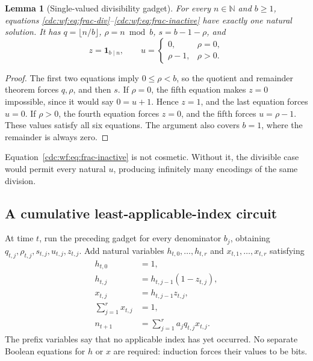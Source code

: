 \documentclass[11pt,a4paper]{article}
\newtheorem{lemma}[lemma]{Lemma}
\theoremstyle{definition}
\theoremstyle{remark}
\newcommand{\N}{\mathbb N}
\begin{document}
\begin{lemma}[Single-valued divisibility gadget]\label{cdc:wf:lem:division}
For every $n\in\N$ and $b\geq1$, equations \eqref{cdc:wf:eq:frac-div}--\eqref{cdc:wf:eq:frac-inactive} have exactly one natural solution. It has $q=\lfloor n/b\rfloor$, $\rho=n\bmod b$, $s=b-1-\rho$, and
\[
 z=\mathbf 1_{b\mid n},\qquad
 u=\begin{cases}0,&\rho=0,\\\rho-1,&\rho>0.\end{cases}
\]
\end{lemma}
\begin{proof}
The first two equations imply $0\leq\rho<b$, so the quotient and remainder theorem forces $q,\rho$, and then $s$. If $\rho=0$, the fifth equation makes $z=0$ impossible, since it would say $0=u+1$. Hence $z=1$, and the last equation forces $u=0$. If $\rho>0$, the fourth equation forces $z=0$, and the fifth forces $u=\rho-1$. These values satisfy all six equations. The argument also covers $b=1$, where the remainder is always zero.
\end{proof}

Equation~\eqref{cdc:wf:eq:frac-inactive} is not cosmetic. Without it, the divisible case would permit every natural $u$, producing infinitely many encodings of the same division.

\subsection{A cumulative least-applicable-index circuit}
At time $t$, run the preceding gadget for every denominator $b_j$, obtaining $q_{t,j},\rho_{t,j},s_{t,j},u_{t,j},z_{t,j}$. Add natural variables $h_{t,0},\ldots,h_{t,r}$ and $x_{t,1},\ldots,x_{t,r}$ satisfying
\begin{align}
 h_{t,0}&=1,\label{cdc:wf:eq:frac-h0}\\
 h_{t,j}&=h_{t,j-1}(1-z_{t,j}),\label{cdc:wf:eq:frac-prefix}\\
 x_{t,j}&=h_{t,j-1}z_{t,j},\label{cdc:wf:eq:frac-first}\\
 \sum_{j=1}^r x_{t,j}&=1,\label{cdc:wf:eq:frac-nonhalt}\\
 n_{t+1}&=\sum_{j=1}^r a_jq_{t,j}x_{t,j}.\label{cdc:wf:eq:frac-output}
\end{align}
The prefix variables say that no applicable index has yet occurred. No separate Boolean equations for $h$ or $x$ are required: induction forces their values to be bits.
\end{document}
